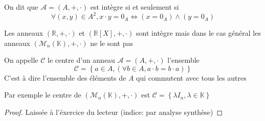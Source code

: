 \documentclass[11pt,colorlinks]{book}
\theoremstyle{mytheoremstyle}
\theoremstyle{mytheoremstyle}
\theoremstyle{mytheoremstyle}
\theoremstyle{mytheoremstyle}
\theoremstyle{mytheoremstyle}
\theoremstyle{mytheoremstyle}
\theoremstyle{mytheoremstyle}
\theoremstyle{mytheoremstyle}
\theoremstyle{myproblemstyle}
\def\mbb#1{\mathbb{#1}}
\def\bR{\mbb{R}}
\def\bK{\mbb{K}}
\begin{document}
\begin{definition}
  On dit que $\mathcal A = (A,+,\cdot)$ est intègre si et seulement si 
  \begin{equation*}
    \forall (x,y) \in A^2, x \cdot y = 0_A \Leftrightarrow (x = 0_A) \wedge (y = 0_A)
  \end{equation*}
\end{definition}
\begin{ex}
  Les anneaux $(\bR,+,\cdot)$ et $(\bR[X],+,\cdot)$ sont intègre mais dans le cas général les anneaux $(\mathcal M_n(\bK),+,\cdot)$ 
  ne le sont pas
\end{ex}
\begin{definition}
  On appelle $\mathcal C $ le centre d'un anneau $\mathcal A = (A,+,\cdot)$ l'ensemble 
  \begin{equation*}
    \mathcal C = \left\{a \in A, (\forall b \in A, a \cdot b = b \cdot a)\right\}
  \end{equation*}
  C'est à dire l'ensemble des éléments de $A$ qui commutent avec tous les autres
\end{definition}
\begin{ex}
  Par exemple le centre de $(\mathcal M_n(\bK),+,\cdot)$ est $\mathcal C = \left\{\lambda I_n, \lambda \in \bK\right\}$
  \begin{proof}
    Laissée à l'éxercice du lecteur (indice: par analyse synthèse)
  \end{proof}
\end{ex}
\end{document}
